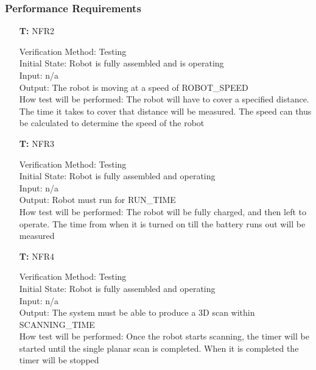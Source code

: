 \documentclass[12pt, titlepage]{article}
\newcounter{tnum} %
\begin{document}
\subsubsection{Performance Requirements}  
\begin{itemize}
  
\item[\textbf{T\refstepcounter{tnum}\thetnum:}]{NFR2\\}

Verification Method: Testing	\\				
Initial State: Robot is fully assembled and is operating	\\			
Input: n/a\\
Output: The robot is moving at a speed of ROBOT\_SPEED \\
How test will be performed: The robot will have to cover a specified distance. The time it takes to cover that distance will be measured. The speed can thus be calculated to determine the speed of the robot \\
  
\item[\textbf{T\refstepcounter{tnum}\thetnum:}]{NFR3\\}

Verification Method: Testing	\\				
Initial State: Robot is fully assembled and operating	\\			
Input: n/a\\
Output: Robot must run for RUN\_TIME \\
How test will be performed: The robot will be fully charged, and then left to operate. The time from when it is turned on till the battery runs out will be measured \\
			

\item[\textbf{T\refstepcounter{tnum}\thetnum:}]{NFR4\\}

Verification Method: Testing	\\				
Initial State: Robot is fully assembled	and operating\\			
Input: n/a\\
Output: The system must be able to produce a 3D scan within SCANNING\_TIME \\
How test will be performed: Once the robot starts scanning, the timer will be started until the single planar scan is completed. When it is completed the timer will be stopped \\


\end{itemize}
\end{document}
